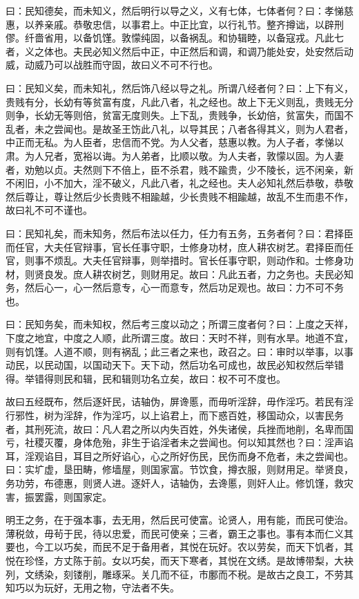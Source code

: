 \documentclass[]{article}
\begin{document}
曰：民知德矣，而未知义，然后明行以导之义，义有七体，七体者何？曰：孝悌慈惠，以养亲戚。恭敬忠信，以事君上。中正比宜，以行礼节。整齐撙诎，以辟刑僇。纤嗇省用，以备饥馑。敦懞纯固，以备祸乱。和协辑睦，以备寇戎。凡此七者，义之体也。夫民必知义然后中正，中正然后和调，和调乃能处安，处安然后动威，动威乃可以战胜而守固，故曰义不可不行也。

曰：民知义矣，而未知礼，然后饰八经以导之礼。所谓八经者何？曰：上下有义，贵贱有分，长幼有等贫富有度，凡此八者，礼之经也。故上下无义则乱，贵贱无分则争，长幼无等则倍，贫富无度则失。上下乱，贵贱争，长幼倍，贫富失，而国不乱者，未之尝闻也。是故圣王饬此八礼，以导其民；八者各得其义，则为人君者，中正而无私。为人臣者，忠信而不党。为人父者，慈惠以教。为人子者，孝悌以肃。为人兄者，宽裕以诲。为人弟者，比顺以敬。为人夫者，敦懞以固。为人妻者，劝勉以贞。夫然则下不倍上，臣不杀君，贱不踰贵，少不陵长，远不闲亲，新不闲旧，小不加大，淫不破义，凡此八者，礼之经也。夫人必知礼然后恭敬，恭敬然后尊让，尊让然后少长贵贱不相踰越，少长贵贱不相踰越，故乱不生而患不作，故曰礼不可不谨也。

曰：民知礼矣，而未知务，然后布法以任力，任力有五务，五务者何？曰：君择臣而任官，大夫任官辩事，官长任事守职，士修身功材，庶人耕农树艺。君择臣而任官，则事不烦乱。大夫任官辩事，则举措时。官长任事守职，则动作和。士修身功材，则贤良发。庶人耕农树艺，则财用足。故曰：凡此五者，力之务也。夫民必知务，然后心一，心一然后意专，心一而意专，然后功足观也。故曰：力不可不务也。

曰：民知务矣，而未知权，然后考三度以动之；所谓三度者何？曰：上度之天祥，下度之地宜，中度之人顺，此所谓三度。故曰：天时不祥，则有水旱。地道不宜，则有饥馑。人道不顺，则有祸乱；此三者之来也，政召之。曰：审时以举事，以事动民，以民动国，以国动天下。天下动，然后功名可成也，故民必知权然后举错得。举错得则民和辑，民和辑则功名立矣，故曰：权不可不度也。

故曰五经既布，然后逐奸民，诘轴伪，屏谗慝，而毋听淫辞，毋作淫巧。若民有淫行邪性，树为淫辞，作为淫巧，以上谄君上，而下惑百姓，移国动众，以害民务者，其刑死流，故曰：凡人君之所以内失百姓，外失诸侯，兵挫而地削，名卑而国亏，社稷灭覆，身体危殆，非生于谄淫者未之尝闻也。何以知其然也？曰：淫声谄耳，淫观谄目，耳目之所好谄心，心之所好伤民，民伤而身不危者，未之尝闻也。曰：实圹虚，垦田畴，修墙屋，则国家富。节饮食，撙衣服，则财用足。举贤良，务功劳，布德惠，则贤人进。逐奸人，诘轴伪，去谗慝，则奸人止。修饥馑，救灾害，振罢露，则国家定。

明王之务，在于强本事，去无用，然后民可使富。论贤人，用有能，而民可使治。薄税敛，毋茍于民，待以忠爱，而民可使亲；三者，霸王之事也。事有本而仁义其要也，今工以巧矣，而民不足于备用者，其悦在玩好。农以劳矣，而天下饥者，其悦在珍怪，方丈陈于前。女以巧矣，而天下寒者，其悦在文绣。是故博带梨，大袂列，文绣染，刻镂削，雕琢采。关几而不征，市鄽而不税。是故古之良工，不劳其知巧以为玩好，无用之物，守法者不失。
\end{document}
